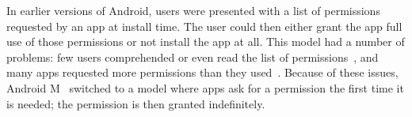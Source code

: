 

In earlier versions of Android, users were presented
with a list of permissions requested by an app at install time. The
user could then either grant the app full use of those permissions or
not install the app at all. This model had a number of
problems: few users comprehended or even read the list of permissions~\cite{Felt:2012soups},
and many apps requested more permissions than they used~\cite{Felt:2011}. 
Because of these
issues, Android M~\cite{AndroidMPermissions} switched to a model where
apps ask for a permission the first time it is needed; the permission is 
then granted indefinitely.

